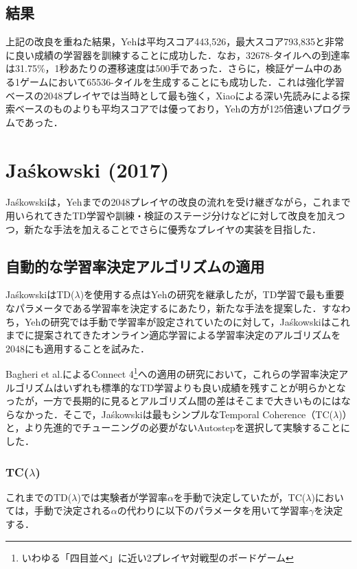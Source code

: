 \documentclass{suribt}
\begin{document}
\subsection{結果}
上記の改良を重ねた結果，Yehは平均スコア443,526，最大スコア793,835と非常に良い成績の学習器を訓練することに成功した．なお，32678-タイルへの到達率は31.75\%，1秒あたりの遷移速度は500手であった．さらに，検証ゲーム中のある1ゲームにおいて65536-タイルを生成することにも成功した．これは強化学習ベースの2048プレイヤでは当時として最も強く，Xiaoによる深い先読みによる探索ベースのものよりも平均スコアでは優っており，Yehの方が125倍速いプログラムであった．

\section{Ja\'{s}kowski (2017)}
Ja\'{s}kowskiは，Yehまでの2048プレイヤの改良の流れを受け継ぎながら，これまで用いられてきたTD学習や訓練・検証のステージ分けなどに対して改良を加えつつ，新たな手法を加えることでさらに優秀なプレイヤの実装を目指した．

\subsection{自動的な学習率決定アルゴリズムの適用}
Ja\'{s}kowskiはTD(${\lambda}$)を使用する点はYehの研究を継承したが，TD学習で最も重要なパラメータである学習率を決定するにあたり，新たな手法を提案した．すなわち，Yehの研究では手動で学習率が設定されていたのに対して，Ja\'{s}kowskiはこれまでに提案されてきたオンライン適応学習による学習率決定のアルゴリズムを2048にも適用することを試みた．

Bagheri et al.によるConnect 4\footnote{いわゆる「四目並べ」に近い2プレイヤ対戦型のボードゲーム}への適用の研究において，これらの学習率決定アルゴリズムはいずれも標準的なTD学習よりも良い成績を残すことが明らかとなったが\cite{Bagheri}，一方で長期的に見るとアルゴリズム間の差はそこまで大きいものにはならなかった．そこで，Ja\'{s}kowskiは最もシンプルなTemporal Coherence（TC(${\lambda}$)）と，より先進的でチューニングの必要がないAutostepを選択して実験することにした．

\subsubsection{TC(${\lambda}$)}
これまでのTD(${\lambda}$)では実験者が学習率${\alpha}$を手動で決定していたが，TC(${\lambda}$)においては，手動で決定される${\alpha}$の代わりに以下のパラメータを用いて学習率${\gamma}$を決定する．
\end{document}
